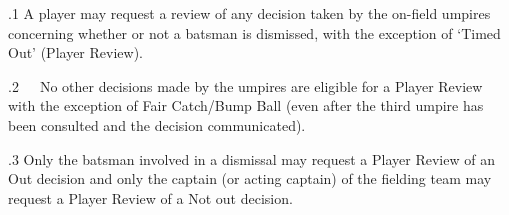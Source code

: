 \documentclass[12pt]{article}
\begin{document}
\vspace{\baselineskip}
\begin{adjustwidth}{0.5in}{0.22in}
{\fontsize{9pt}{10.8pt}.1 \tabto{0.49in} A player may request a review of any decision taken by the on-field umpires concerning whether or not a batsman is dismissed, with the exception of ‘Timed Out’ (Player Review).\par}\par

\end{adjustwidth}


\vspace{\baselineskip}
\begin{adjustwidth}{0.0in}{0.56in}
\begin{FlushRight}
{\fontsize{9pt}{10.8pt}.2\ \ \  No other decisions made by the umpires are eligible for a Player Review with the exception of Fair Catch/Bump Ball (even after the third umpire has been consulted and the decision communicated).\par}
\end{FlushRight}\par

\end{adjustwidth}


\vspace{\baselineskip}

\vspace{\baselineskip}

\vspace{\baselineskip}
\begin{Center}
{\fontsize{8pt}{9.6pt}\par}
\end{Center}\par


\vspace{\baselineskip}

\vspace{\baselineskip}
\begin{adjustwidth}{0.5in}{0.32in}
{\fontsize{9pt}{10.8pt}.3 \tabto{0.49in} Only the batsman involved in a dismissal may request a Player Review of an Out decision and only the captain (or acting captain) of the fielding team may request a Player Review of a Not out decision.\par}\par

\end{adjustwidth}
\end{document}
